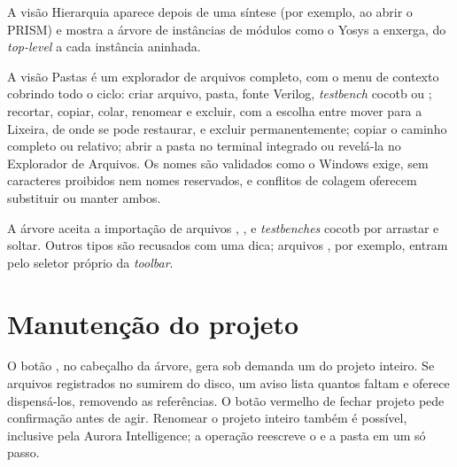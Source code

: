 A visão Hierarquia aparece depois de uma síntese (por exemplo, ao abrir o PRISM) e mostra a árvore de instâncias de módulos como o Yosys a enxerga, do \textit{top-level} a cada instância aninhada.

A visão Pastas é um explorador de arquivos completo, com o menu de contexto cobrindo todo o ciclo: criar arquivo, pasta, fonte Verilog, \textit{testbench} cocotb ou ; recortar, copiar, colar, renomear e excluir, com a escolha entre mover para a Lixeira, de onde se pode restaurar, e excluir permanentemente; copiar o caminho completo ou relativo; abrir a pasta no terminal integrado ou revelá-la no Explorador de Arquivos. Os nomes são validados como o Windows exige, sem caracteres proibidos nem nomes reservados, e conflitos de colagem oferecem substituir ou manter ambos.


\begin{nota}
A árvore aceita a importação de arquivos , ,  e \textit{testbenches} cocotb  por arrastar e soltar. Outros tipos são recusados com uma dica; arquivos , por exemplo, entram pelo seletor próprio da \textit{toolbar}.
\end{nota}

\section{Manutenção do projeto}

O botão , no cabeçalho da árvore, gera sob demanda um  do projeto inteiro. Se arquivos registrados no  sumirem do disco, um aviso lista quantos faltam e oferece dispensá-los, removendo as referências. O botão vermelho de fechar projeto pede confirmação antes de agir. Renomear o projeto inteiro também é possível, inclusive pela Aurora Intelligence; a operação reescreve o  e a pasta em um só passo.

